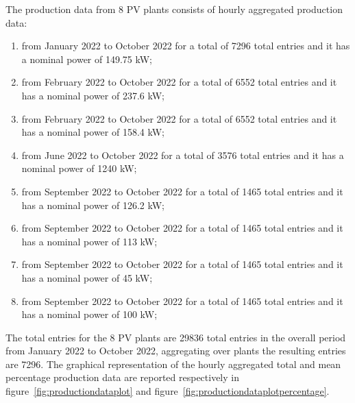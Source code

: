 The production data from 8 PV plants consists of hourly aggregated production data:
\begin{enumerate}
  \item from January 2022 to October 2022 for a total of 7296 total entries and it has a nominal power of 149.75 kW;
  \item from February 2022 to October 2022 for a total of 6552 total entries and it has a nominal power of 237.6 kW;
  \item from February 2022 to October 2022 for a total of 6552 total entries and it has a nominal power of 158.4 kW;
  \item from June 2022 to October 2022 for a total of 3576 total entries and it has a nominal power of 1240 kW;
  \item from September 2022 to October 2022 for a total of 1465 total entries and it has a nominal power of 126.2 kW;
  \item from September 2022 to October 2022 for a total of 1465 total entries and it has a nominal power of 113 kW;
  \item from September 2022 to October 2022 for a total of 1465 total entries and it has a nominal power of 45 kW;
  \item from September 2022 to October 2022 for a total of 1465 total entries and it has a nominal power of 100 kW;
\end{enumerate}
The total entries for the 8 PV plants are 29836 total entries in the overall period from January 2022 to October 2022, aggregating over plants the resulting entries are 7296.
The graphical representation of the hourly aggregated total and mean percentage production data are reported respectively in figure~\ref{fig:productiondataplot} and figure~\ref{fig:productiondataplotpercentage}.

